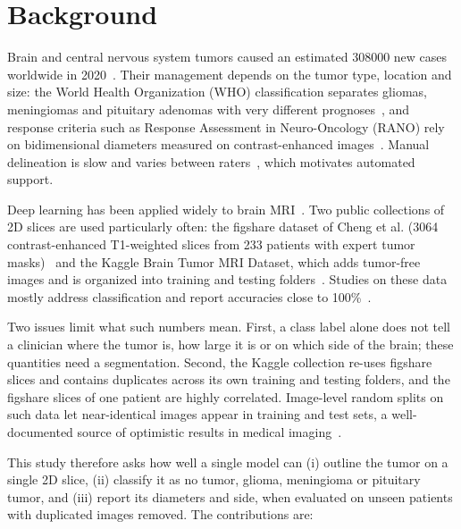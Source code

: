 \documentclass[pdflatex,sn-vancouver-num,iicol]{sn-jnl}
\begin{document}

\maketitle

\section{Background}\label{sec:background}

Brain and central nervous system tumors caused an estimated 308000 new cases worldwide in 2020~\cite{sung2021globocan}. Their management depends on the tumor type, location and size: the World Health Organization (WHO) classification separates gliomas, meningiomas and pituitary adenomas with very different prognoses~\cite{louis2021who}, and response criteria such as Response Assessment in Neuro-Oncology (RANO) rely on bidimensional diameters measured on contrast-enhanced images~\cite{wen2010rano}. Manual delineation is slow and varies between raters~\cite{menze2015}, which motivates automated support.

Deep learning has been applied widely to brain MRI~\cite{litjens2017}. Two public collections of 2D slices are used particularly often: the figshare dataset of Cheng et al. (3064 contrast-enhanced T1-weighted slices from 233 patients with expert tumor masks)~\cite{cheng2015,cheng2016,cheng2017figshare} and the Kaggle Brain Tumor MRI Dataset, which adds tumor-free images and is organized into training and testing folders~\cite{nickparvar2021kaggle}. Studies on these data mostly address classification and report accuracies close to 100\%~\cite{swati2019,deepak2019}.

Two issues limit what such numbers mean. First, a class label alone does not tell a clinician where the tumor is, how large it is or on which side of the brain; these quantities need a segmentation. Second, the Kaggle collection re-uses figshare slices and contains duplicates across its own training and testing folders, and the figshare slices of one patient are highly correlated. Image-level random splits on such data let near-identical images appear in training and test sets, a well-documented source of optimistic results in medical imaging~\cite{varoquaux2022,roberts2021}.

This study therefore asks how well a single model can (i) outline the tumor on a single 2D slice, (ii) classify it as no tumor, glioma, meningioma or pituitary tumor, and (iii) report its diameters and side, when evaluated on unseen patients with duplicated images removed. The contributions are:
\end{document}
